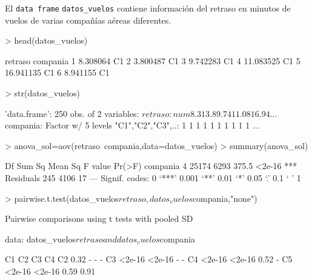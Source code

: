 \documentclass[10pt]{article}
\newcounter{problemes}
\newcounter{punts} \def\thepunts{\arabic{punts}}
\def\probl{\addtocounter{problemes}{1} \setcounter{punts}{0}
\medskip\noindent{\bf \theproblemes) }}
\begin{document}
\setcounter{problemes}{0}
\probl El \verb+data frame+ \verb+datos_vuelos+ contiene información del retraso en minutos de vuelos de varias compañías aéreas diferentes.



\begin{Schunk}
\begin{Sinput}
> head(datos_vuelos)
\end{Sinput}
\begin{Soutput}
    retraso compania
1  8.308064       C1
2  3.800487       C1
3  9.742283       C1
4 11.083525       C1
5 16.941135       C1
6  8.941155       C1
\end{Soutput}
\begin{Sinput}
> str(datos_vuelos)
\end{Sinput}
\begin{Soutput}
'data.frame':	250 obs. of  2 variables:
 $ retraso : num  8.31 3.8 9.74 11.08 16.94 ...
 $ compania: Factor w/ 5 levels "C1","C2","C3",..: 1 1 1 1 1 1 1 1 1 1 ...
\end{Soutput}
\begin{Sinput}
> anova_sol=aov(retraso~compania,data=datos_vuelos)
> summary(anova_sol)
\end{Sinput}
\begin{Soutput}
             Df Sum Sq Mean Sq F value Pr(>F)    
compania      4  25174    6293   375.5 <2e-16 ***
Residuals   245   4106      17                   
---
Signif. codes:  0 ‘***’ 0.001 ‘**’ 0.01 ‘*’ 0.05 ‘.’ 0.1 ‘ ’ 1
\end{Soutput}
\begin{Sinput}
> pairwise.t.test(datos_vuelos$retraso,datos_vuelos$compania,"none")
\end{Sinput}
\begin{Soutput}
	Pairwise comparisons using t tests with pooled SD 

data:  datos_vuelos$retraso and datos_vuelos$compania 

   C1     C2     C3   C4  
C2 0.32   -      -    -   
C3 <2e-16 <2e-16 -    -   
C4 <2e-16 <2e-16 0.52 -   
C5 <2e-16 <2e-16 0.59 0.91


\end{Soutput}
\end{Schunk}
\end{document}
